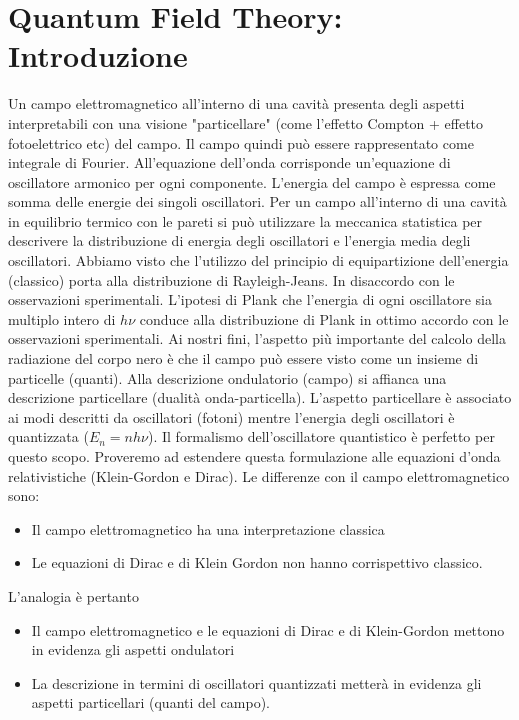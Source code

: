 \section{Quantum Field Theory: Introduzione}
Un campo elettromagnetico all'interno di una cavità presenta degli aspetti interpretabili con una visione "particellare" (come l'effetto Compton + effetto fotoelettrico etc) del campo. Il campo quindi può essere rappresentato come integrale di Fourier. All'equazione dell'onda corrisponde un'equazione di oscillatore armonico per ogni componente. L'energia del campo è espressa come somma delle energie dei singoli oscillatori. Per un campo all'interno di una cavità in equilibrio termico con le pareti si può utilizzare la meccanica statistica per descrivere la distribuzione di energia degli oscillatori e l'energia media degli oscillatori. Abbiamo visto che l'utilizzo del principio di equipartizione dell'energia (classico) porta alla distribuzione di Rayleigh-Jeans. In disaccordo con le osservazioni sperimentali. L'ipotesi di Plank che l'energia di ogni oscillatore sia multiplo intero di $h\nu$ conduce alla distribuzione di Plank in ottimo accordo con le osservazioni sperimentali. Ai nostri fini, l'aspetto più importante del calcolo della radiazione del corpo nero è che il campo può essere visto come un insieme di particelle (quanti). Alla descrizione ondulatorio (campo) si affianca una descrizione particellare (dualità onda-particella). L'aspetto particellare è associato ai modi descritti da oscillatori (fotoni) mentre l'energia degli oscillatori è quantizzata ($E_n=nh\nu$). Il formalismo dell'oscillatore quantistico è perfetto per questo scopo. Proveremo ad estendere questa formulazione alle equazioni d'onda relativistiche (Klein-Gordon e Dirac). Le differenze con il campo elettromagnetico sono:
\begin{itemize}
    \item Il campo elettromagnetico ha una interpretazione classica
    \item Le equazioni di Dirac e di Klein Gordon non hanno corrispettivo classico.
\end{itemize}
L'analogia è pertanto
\begin{itemize}
    \item Il campo elettromagnetico e le equazioni di Dirac e di Klein-Gordon mettono in evidenza gli aspetti ondulatori
    \item La descrizione in termini di oscillatori quantizzati metterà in evidenza gli aspetti particellari (quanti del campo).
\end{itemize}
